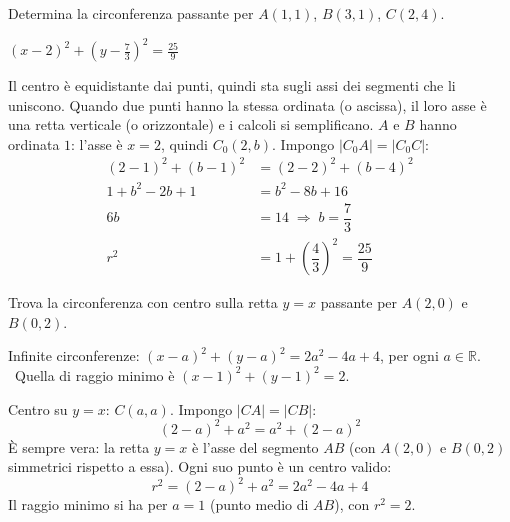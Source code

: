 \begin{question}[ID=2.12, subtitle={Circonferenza per $A(1,1)$, $B(3,1)$, $C(2,4)$}, difficulty=difficile, tags={circonferenza}]
Determina la circonferenza passante per $A(1,1)$, $B(3,1)$, $C(2,4)$.
\begin{solution}
$(x-2)^2+\left(y-\tfrac73\right)^2=\tfrac{25}{9}$
\end{solution}
\begin{explanation}
Il centro è equidistante dai punti, quindi sta sugli assi dei segmenti che li uniscono. Quando due punti hanno la stessa ordinata (o ascissa), il loro asse è una retta verticale (o orizzontale) e i calcoli si semplificano.
$A$ e $B$ hanno ordinata $1$: l'asse è $x=2$, quindi $C_0(2,b)$. Impongo $|C_0A|=|C_0C|$:
\[\begin{aligned}
(2-1)^2+(b-1)^2 &= (2-2)^2+(b-4)^2\\
1+b^2-2b+1 &= b^2-8b+16\\
6b &= 14 \;\Rightarrow\; b=\dfrac73\\
r^2 &= 1+\left(\dfrac43\right)^2=\dfrac{25}{9}
\end{aligned}\]
\end{explanation}
\end{question}


\begin{question}[ID=2.13, subtitle={Circonferenza con centro su $y=x$ per $A(2,0)$ e $B(0,2)$}, difficulty=difficile, tags={circonferenza}]
Trova la circonferenza con centro sulla retta $y=x$ passante per $A(2,0)$ e $B(0,2)$.
\begin{solution}
Infinite circonferenze: $(x-a)^2+(y-a)^2=2a^2-4a+4$, per ogni $a\in\mathbb{R}$. \ Quella di raggio minimo è $(x-1)^2+(y-1)^2=2$.
\end{solution}
\begin{explanation}
Centro su $y=x$: $C(a,a)$. Impongo $|CA|=|CB|$:
\[ (2-a)^2+a^2=a^2+(2-a)^2 \]
È sempre vera: la retta $y=x$ è l'asse del segmento $AB$ (con $A(2,0)$ e $B(0,2)$ simmetrici rispetto a essa). Ogni suo punto è un centro valido:
\[ r^2=(2-a)^2+a^2=2a^2-4a+4 \]
Il raggio minimo si ha per $a=1$ (punto medio di $AB$), con $r^2=2$.
\end{explanation}
\end{question}


